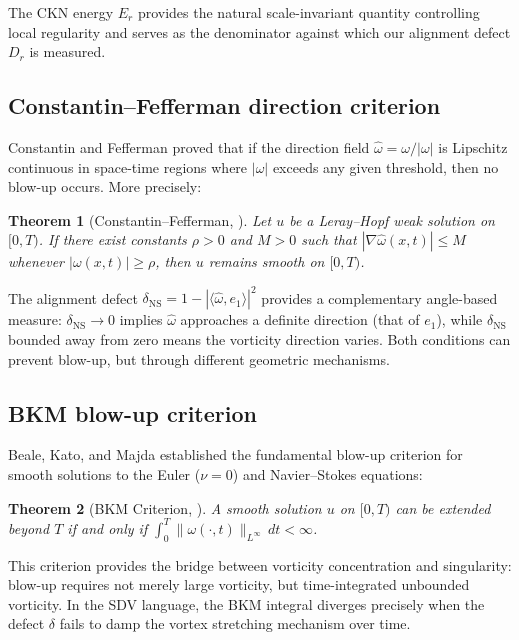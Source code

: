 \documentclass[11pt]{article}
\newtheorem{theorem}{Theorem}[section]
\theoremstyle{definition}
\theoremstyle{remark}
\begin{document}
The CKN energy $E_r$ provides the natural scale-invariant quantity controlling
local regularity and serves as the denominator against which our alignment defect
$D_r$ is measured.

\subsection{Constantin--Fefferman direction criterion}

Constantin and Fefferman \cite{CF} proved that if the direction field
$\hat\omega = \omega/|\omega|$ is Lipschitz continuous in space-time regions
where $|\omega|$ exceeds any given threshold, then no blow-up occurs.  More
precisely:

\begin{theorem}[Constantin--Fefferman, {\cite{CF}}]
\label{thm:CF}
Let $u$ be a Leray--Hopf weak solution on $[0,T)$.  If there exist constants
$\rho > 0$ and $M > 0$ such that $|\nabla\hat\omega(x,t)| \leq M$ whenever
$|\omega(x,t)| \geq \rho$, then $u$ remains smooth on $[0,T)$.
\end{theorem}

The alignment defect $\delta_{\mathrm{NS}} = 1 - |\langle\hat\omega, e_1\rangle|^2$
provides a complementary angle-based measure: $\delta_{\mathrm{NS}} \to 0$ implies
$\hat\omega$ approaches a definite direction (that of $e_1$), while
$\delta_{\mathrm{NS}}$ bounded away from zero means the vorticity direction varies.
Both conditions can prevent blow-up, but through different geometric mechanisms.

\subsection{BKM blow-up criterion}

Beale, Kato, and Majda \cite{BKM} established the fundamental blow-up criterion
for smooth solutions to the Euler ($\nu = 0$) and Navier--Stokes equations:

\begin{theorem}[BKM Criterion, {\cite{BKM}}]
\label{thm:BKM}
A smooth solution $u$ on $[0,T)$ can be extended beyond $T$ if and only if
$\int_0^T \|\omega(\cdot,t)\|_{L^\infty}\, dt < \infty$.
\end{theorem}

This criterion provides the bridge between vorticity concentration and singularity:
blow-up requires not merely large vorticity, but time-integrated unbounded vorticity.
In the SDV language, the BKM integral diverges precisely when the defect $\delta$
fails to damp the vortex stretching mechanism over time.
\end{document}
